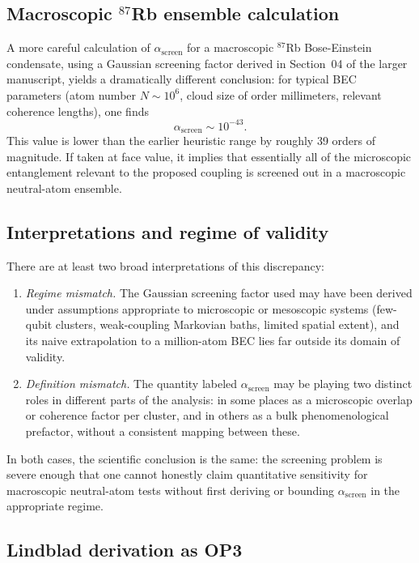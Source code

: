 \documentclass[11pt]{article}
\begin{document}
\subsection{Macroscopic $^{87}$Rb ensemble calculation}

A more careful calculation of $\alpha_{\text{screen}}$ for a macroscopic $^{87}$Rb Bose-Einstein condensate, using a Gaussian screening factor derived in Section~04 of the larger manuscript, yields a dramatically different conclusion: for typical BEC parameters (atom number $N\sim 10^6$, cloud size of order millimeters, relevant coherence lengths), one finds
\begin{equation}
 \alpha_{\text{screen}} \sim 10^{-43}.
\end{equation}
This value is lower than the earlier heuristic range by roughly 39 orders of magnitude. If taken at face value, it implies that essentially all of the microscopic entanglement relevant to the proposed coupling is screened out in a macroscopic neutral-atom ensemble.

\subsection{Interpretations and regime of validity}

There are at least two broad interpretations of this discrepancy:
\begin{enumerate}
 \item \emph{Regime mismatch.} The Gaussian screening factor used may have been derived under assumptions appropriate to microscopic or mesoscopic systems (few-qubit clusters, weak-coupling Markovian baths, limited spatial extent), and its naive extrapolation to a million-atom BEC lies far outside its domain of validity.
 \item \emph{Definition mismatch.} The quantity labeled $\alpha_{\text{screen}}$ may be playing two distinct roles in different parts of the analysis: in some places as a microscopic overlap or coherence factor per cluster, and in others as a bulk phenomenological prefactor, without a consistent mapping between these.
\end{enumerate}

In both cases, the scientific conclusion is the same: the screening problem is severe enough that one cannot honestly claim quantitative sensitivity for macroscopic neutral-atom tests without first deriving or bounding $\alpha_{\text{screen}}$ in the appropriate regime.

\subsection{Lindblad derivation as OP3}
\end{document}
